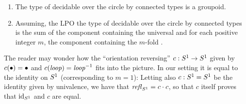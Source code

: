 \begin{lemma}
  \label{lem:componentsofcoversofS1}
  \begin{enumerate}
  \item The type of decidable \coverings over the circle by connected types is a groupoid.
  \item Assuming, the LPO the type of decidable \coverings over the circle by connected types is the sum of the component containing the universal \covering and for each positive integer $m$, the component containing the $m$-fold \covering.
  \end{enumerate}

\end{lemma}





\begin{remark}
  \label{rem:flipthecircle}
  The reader may wonder how the ``orientation reversing'' $c:S^1\to S^1$ given by $c(\bullet)=\bullet$ and $c(\mathit{loop})=\mathit{loop}^{-1}$ fits into the picture.  In our setting it is equal to the identity on $S^1$ (corresponding to $m=1$): Letting also $c:S^1=S^1$ be the identity given by univalence, we have that $\mathop{{\it refl}_{S^1}}=c\cdot c$, so that $c$ itself proves that $\mathord{\mathrm{id}}_{S^1}$ and $c$ are equal.
\end{remark}



